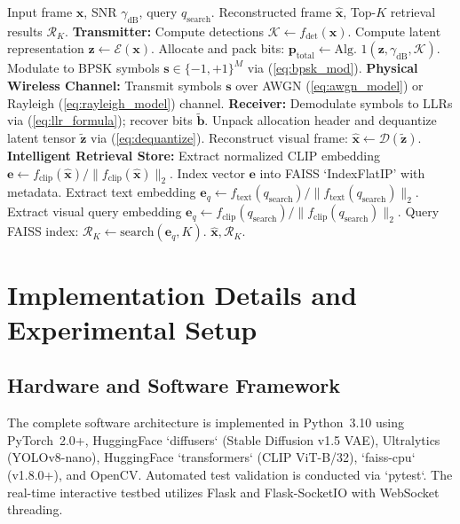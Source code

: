 \documentclass[journal,twocolumn]{IEEEtran}
\begin{document}
\begin{algorithm}[t]
\caption{Integrated Transmission, Reconstruction, and FAISS Retrieval}
\label{alg:integrated_pipeline}
\begin{algorithmic}[1]
\REQUIRE Input frame $\mathbf{x}$, SNR $\gamma_{\text{dB}}$, query $q_{\text{search}}$.
\ENSURE Reconstructed frame $\hat{\mathbf{x}}$, Top-$K$ retrieval results $\mathcal{R}_K$.
\STATE \textbf{Transmitter:}
\STATE Compute detections $\mathcal{K} \leftarrow f_{\text{det}}(\mathbf{x})$.
\STATE Compute latent representation $\mathbf{z} \leftarrow \mathcal{E}(\mathbf{x})$.
\STATE Allocate and pack bits: $\mathbf{p}_{\text{total}} \leftarrow \text{Alg.~1}(\mathbf{z}, \gamma_{\text{dB}}, \mathcal{K})$.
\STATE Modulate to BPSK symbols $\mathbf{s} \in \{-1, +1\}^M$ via (\ref{eq:bpsk_mod}).
\STATE \textbf{Physical Wireless Channel:}
\STATE Transmit symbols $\mathbf{s}$ over AWGN (\ref{eq:awgn_model}) or Rayleigh (\ref{eq:rayleigh_model}) channel.
\STATE \textbf{Receiver:}
\STATE Demodulate symbols to LLRs via (\ref{eq:llr_formula}); recover bits $\tilde{\mathbf{b}}$.
\STATE Unpack allocation header and dequantize latent tensor $\tilde{\mathbf{z}}$ via (\ref{eq:dequantize}).
\STATE Reconstruct visual frame: $\hat{\mathbf{x}} \leftarrow \mathcal{D}(\tilde{\mathbf{z}})$.
\STATE \textbf{Intelligent Retrieval Store:}
\STATE Extract normalized CLIP embedding $\mathbf{e} \leftarrow f_{\text{clip}}(\hat{\mathbf{x}}) / \|f_{\text{clip}}(\hat{\mathbf{x}})\|_2$.
\STATE Index vector $\mathbf{e}$ into FAISS `IndexFlatIP' with metadata.
    \STATE Extract text embedding $\mathbf{e}_q \leftarrow f_{\text{text}}(q_{\text{search}}) / \|f_{\text{text}}(q_{\text{search}})\|_2$.
\ELSE
    \STATE Extract visual query embedding $\mathbf{e}_q \leftarrow f_{\text{clip}}(q_{\text{search}}) / \|f_{\text{clip}}(q_{\text{search}})\|_2$.
\ENDIF
\STATE Query FAISS index: $\mathcal{R}_K \leftarrow \text{search}(\mathbf{e}_q, K)$.
\RETURN $\hat{\mathbf{x}}, \mathcal{R}_K$.
\end{algorithmic}
\end{algorithm}

\section{Implementation Details and Experimental Setup}
\subsection{Hardware and Software Framework}
The complete software architecture is implemented in Python~3.10 using PyTorch~2.0+, HuggingFace `diffusers` (Stable Diffusion v1.5 VAE), Ultralytics (YOLOv8-nano), HuggingFace `transformers` (CLIP ViT-B/32), `faiss-cpu` (v1.8.0+), and OpenCV. Automated test validation is conducted via `pytest`. The real-time interactive testbed utilizes Flask and Flask-SocketIO with WebSocket threading.
\end{document}
